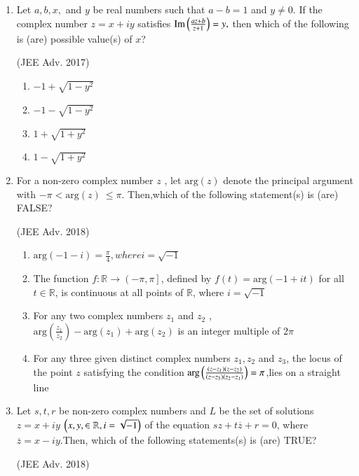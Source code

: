 \documentclass[journal,12pt,twocolumn]{IEEEtran}
\theoremstyle{remark}
\begin{document}
\begin{enumerate}
    \item Let $ a, b, x, $ and $ y $ be real numbers such that $ a - b = 1 $ and $ y \ne 0 $. If the complex number $ z = x + iy $ satisfies 
$
\text{Im}\left(\frac{az + b}{z + 1}\right) = y,
$
then which of the following is (are) possible value(s) of $ x $? 

\hfill (JEE Adv. 2017)

\begin{enumerate}[label=(\alph*)]
    \item $ -1+\sqrt{1-y^2} $
    \item $ -1-\sqrt{1-y^2} $
    \item $ 1+\sqrt{1+y^2} $
    \item $ 1-\sqrt{1+y^2} $
    \end{enumerate}

    \item For a non-zero complex number $ z $ , let $ \mathrm{arg}(z) $ denote the principal argument with $ -\pi < \mathrm{arg}(z)\ \leq \pi $. Then,which of the following statement(s) is (are) FALSE? 
    
    \hfill (JEE Adv. 2018)

    \begin{enumerate}[label=(\alph*)]
    \item $ \mathrm{arg}(-1-i)= \frac{\pi}{4},where i= \sqrt{-1} $
    \item The function $ f: \mathbb{R} \to \left(-\pi, \pi\right] $, defined by $ f(t)=\mathrm{arg}(-1+it) $ for all $ t \in \mathbb{R} $, is continuous at all points of $ \mathbb{R} $, where $ i= \sqrt{-1} $
    \item For any two complex numbers $ z_1 $ and $ z_2 $ , $ \mathrm{arg}(\frac{z_1}{z_2})-\mathrm{arg}(z_1)+\mathrm{arg}(z_2) $ is an integer multiple of $ 2\pi $
    \item For any three given distinct complex numbers $ z_1,z_2 $ and $ z_3 $, the locus of the point $ z $ satisfying the condition $ \mathrm{arg} \left(\frac{(z-z_1)(z-z_2)}{(z-z_3)(z_2-z_1)}\right) =\pi $,lies on a straight line
    \end{enumerate}

    \item Let $ s, t, r $ be non-zero complex numbers and $ L $ be the set of solutions  $ z = x + iy $ $ \left(x,y, \in \mathbb{R},i=\sqrt{-1}\right) $ of the equation $ sz + t\overline{z} + r = 0 $, where $ \overline{z}=x-iy $.Then, which of the following statements(s) is (are) TRUE?

    \hfill (JEE Adv. 2018)


\end{enumerate}
\end{document}
